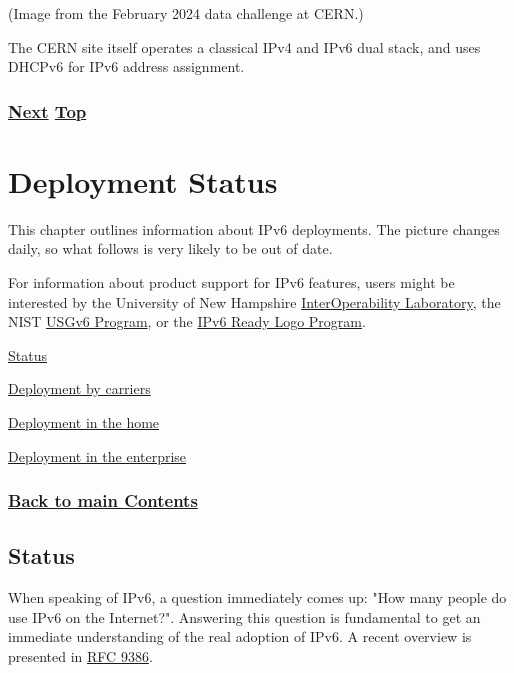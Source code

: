 \documentclass[
]{article}
\begin{document}
(Image from the February 2024 data challenge at CERN.)

The CERN site itself operates a classical IPv4 and IPv6 dual stack, and
uses DHCPv6 for IPv6 address assignment.

\subsubsection{\texorpdfstring{\hyperref[deployment-status]{Next}
\hyperref[case-studies]{Top}}{Next Top}}\label{next-top-6}

\pagebreak

\section{Deployment Status}\label{deployment-status}

This chapter outlines information about IPv6 deployments. The picture
changes daily, so what follows is very likely to be out of date.

For information about product support for IPv6 features, users might be
interested by the University of New Hampshire
\href{https://www.iol.unh.edu/testing/ipv6}{InterOperability
Laboratory}, the NIST
\href{https://www.nist.gov/programs-projects/usgv6-program}{USGv6
Program}, or the \href{https://www.ipv6ready.org/}{IPv6 Ready Logo
Program}.

\hyperref[status]{Status}

\hyperref[deployment-by-carriers]{Deployment by carriers}

\hyperref[deployment-in-the-home]{Deployment in the home}

\hyperref[deployment-in-the-enterprise]{Deployment in the enterprise}

\subsubsection{\texorpdfstring{\hyperref[list-of-contents]{Back to main
Contents}}{Back to main Contents}}\label{back-to-main-contents-7}

\pagebreak

\subsection{Status}\label{status}

When speaking of IPv6, a question immediately comes up: "How many people
do use IPv6 on the Internet?". Answering this question is fundamental to
get an immediate understanding of the real adoption of IPv6. A recent
overview is presented in
\href{https://www.rfc-editor.org/info/rfc9386}{RFC 9386}.
\end{document}
